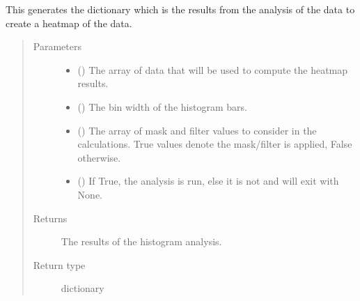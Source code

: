 \documentclass[letterpaper,10pt,english]{sphinxmanual}
\begin{document}
\begin{fulllineitems}
\label{\detokenize{docstrings/ifa_smeargle.analysis.histogram:ifa_smeargle.analysis.histogram.analysis_gaussian_histogram}}
This generates the dictionary which is the results from the
analysis of the data to create a heat\sphinxhyphen{}map of the data.
\begin{quote}\begin{description}
\item[{Parameters}] \leavevmode\begin{itemize}
\item {} 
 () \textendash{} The array of data that will be used to compute the heat\sphinxhyphen{}map
results.

\item {} 
 () \textendash{} The bin width of the histogram bars.

\item {} 
 (\sphinxstyleliteralemphasis{\sphinxupquote{ (}}\sphinxstyleliteralemphasis{\sphinxupquote{)}}) \textendash{} The array of mask and filter values to consider in the
calculations. True values denote the mask/filter is applied,
False otherwise.

\item {} 
 (\sphinxstyleliteralemphasis{\sphinxupquote{ (}}\sphinxstyleliteralemphasis{\sphinxupquote{)}}) \textendash{} If True, the analysis is run, else it is not and will exit
with None.

\end{itemize}

\item[{Returns}] \leavevmode
{} \textendash{} The results of the histogram analysis.

\item[{Return type}] \leavevmode
dictionary

\end{description}\end{quote}

\end{fulllineitems}
\end{document}
